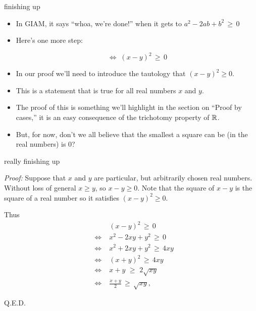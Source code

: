 \documentclass[landscape]{beamer}
\begin{document}
\begin{frame}{finishing up}
\begin{itemize}
\item In GIAM, it says ``whoa, we're done!'' when it gets to $a^2-2ab+b^2 \, \geq \, 0$ \pause
\item Here's one more step: \pause

\[ \iff \; (x-y)^2 \, \geq \, 0 \] 

\pause

\item In our proof we'll need to introduce the tautology \pause \newline
that $(x-y)^2 \geq 0$.  
\item This is a statement that is true for all real numbers $x$ and $y$. \pause
\item The proof of this is something we'll highlight in the section on ``Proof by cases,'' \pause \newline 
it is an easy consequence of the trichotomy property of ${\mathbb R}$. \pause
\item But, for now, don't we all believe that the smallest a square can be (in the real numbers) is $0$?
\end{itemize}
\end{frame}

\begin{frame}{really finishing up}


{\em Proof:} Suppose that $x$ and $y$ are particular, but arbitrarily chosen real numbers.  Without loss of general
$x \geq y$, so $x-y \geq 0$.  Note that the square of $x-y$ is the square of a real number so it satisfies $(x-y)^2 \geq 0$.

Thus 
\begin{align*}
 &         & (x-y)^2 \, \geq \, 0 \\
 & \iff \; & x^2-2xy+y^2 \, \geq \, 0 \\
 & \iff \; & x^2+2xy+y^2 \, \geq \, 4xy \\
 & \iff \; & (x+y)^2 \, \geq \, 4xy \\
 & \iff \; & x+y \, \, \geq \, \, 2\sqrt{xy} \\
 & \iff \; & \frac{x+y}{2} \, \geq \, \sqrt{xy}, 
\end{align*}

\hspace{\fill} Q.E.D.

\end{frame}
\end{document}
